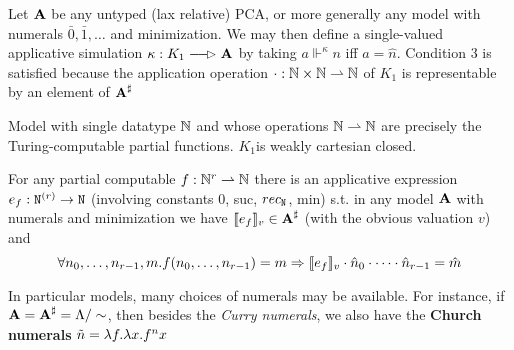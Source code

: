 \documentclass[11pt]{article}
\begin{document}
\begin{examplle}[]
Let \(\operatorname{\textbf{A}}\) be any untyped (lax relative) PCA, or more generally any model with
numerals \(\bar{0},\bar{1},\dots\) and minimization. We may then define a single-valued applicative
simulation \(\kappa:K_1\lrarhd\bA\) by taking \(a\Vdash^\kappa n\) iff \(a=\hat{n}\). Condition 3 is
satisfied because the application operation \(\cdot:\mathbb{N}\times\mathbb{N}\rightharpoonup\mathbb{N}\) of \(K_1\) is representable by an
element of \(\operatorname{\textbf{A}}^\sharp\)

Model with single datatype \(\mathbb{N}\) and whose operations \(\mathbb{N}\rightharpoonup\mathbb{N}\) are precisely the
Turing-computable partial functions. \(K_1\)is weakly cartesian closed.

For any partial computable \(f:\mathbb{N}^r\rightharpoonup\mathbb{N}\) there is an applicative
expression \(e_f:\texttt{N}^{(r)}\to\texttt{N}\) (involving constants 0, suc, \(rec_{\texttt{N}}\), min) s.t. in any
model \(\operatorname{\textbf{A}}\) with numerals and minimization we have \(\llbracket e_f \rrbracket_v\in\operatorname{\textbf{A}}^\sharp\) (with the obvious
valuation \(v\)) and
\begin{equation*}
\forall n_0,\dots,n_{r-1},m. f(n_0,\dots,n_{r-1})=m\Rightarrow\llbracket e_f \rrbracket_v\cdot\hat{n}_0\cdot\dots\cdot\hat{n}_{r-1}=\hat{m}
\end{equation*}

In particular models, many choices of numerals may be available. For instance, if \(\operatorname{\textbf{A}}=\operatorname{\textbf{A}}^\sharp=\Lambda/\sim\),
then besides the \emph{Curry numerals}, we also have the \textbf{Church numerals} \(\tilde{n}=\lambda f.\lambda x.f^nx\)
\end{examplle}
\end{document}
